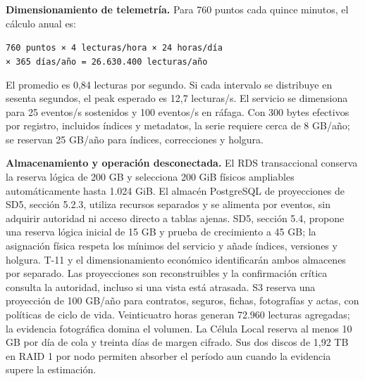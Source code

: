 \textbf{Dimensionamiento de telemetría.} Para 760 puntos cada quince minutos, el cálculo anual es:

\begin{center}
\texttt{760 puntos × 4 lecturas/hora × 24 horas/día}\\
\texttt{× 365 días/año = 26.630.400 lecturas/año}
\end{center}

El promedio es 0,84 lecturas por segundo. Si cada intervalo se distribuye en sesenta segundos, el peak esperado es 12,7 lecturas/s. El servicio se dimensiona para 25 eventos/s sostenidos y 100 eventos/s en ráfaga. Con 300 bytes efectivos por registro, incluidos índices y metadatos, la serie requiere cerca de 8 GB/año; se reservan 25 GB/año para índices, correcciones y holgura.

\textbf{Almacenamiento y operación desconectada.} El RDS transaccional conserva la reserva lógica de 200 GB y selecciona 200 GiB físicos ampliables automáticamente hasta 1.024 GiB. El almacén PostgreSQL de proyecciones de SD5, sección 5.2.3, utiliza recursos separados y se alimenta por eventos, sin adquirir autoridad ni acceso directo a tablas ajenas. SD5, sección 5.4, propone una reserva lógica inicial de 15 GB y prueba de crecimiento a 45 GB; la asignación física respeta los mínimos del servicio y añade índices, versiones y holgura. T-11 y el dimensionamiento económico identificarán ambos almacenes por separado. Las proyecciones son reconstruibles y la confirmación crítica consulta la autoridad, incluso si una vista está atrasada. S3 reserva una proyección de 100 GB/año para contratos, seguros, fichas, fotografías y actas, con políticas de ciclo de vida. Veinticuatro horas generan 72.960 lecturas agregadas; la evidencia fotográfica domina el volumen. La Célula Local reserva al menos 10 GB por día de cola y treinta días de margen cifrado. Sus dos discos de 1,92 TB en RAID 1 por nodo permiten absorber el período aun cuando la evidencia supere la estimación.

